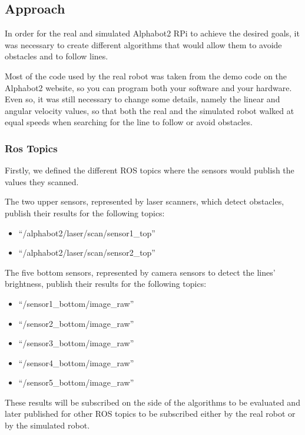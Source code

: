 \documentclass[conference]{IEEEtran}
\begin{document}
\subsection{Approach} \label{alg}

In order for the real and simulated Alphabot2 RPi to achieve the desired goals, it was necessary to create different algorithms that would allow them to avoide obstacles and to follow lines.

Most of the code used by the real robot was taken from the demo code on the Alphabot2 website, so you can program both your software and your hardware. Even so, it was still necessary to change some details, namely the linear and angular velocity values, so that both the real and the simulated robot walked at equal speeds when searching for the line to follow or avoid obstacles.

\subsubsection{Ros Topics} \label{topics}

Firstly, we defined the different ROS topics where the sensors would publish the values they scanned.

The two upper sensors, represented by laser scanners, which detect obstacles, publish their results for the following topics:

\begin{itemize}
    \item ``/alphabot2/laser/scan/sensor1\_top''
    \item ``/alphabot2/laser/scan/sensor2\_top''
\end{itemize}

The five bottom sensors, represented by camera sensors to detect the lines' brightness, publish their results for the following topics:

\begin{itemize}
    \item ``/sensor1\_bottom/image\_raw''
    \item ``/sensor2\_bottom/image\_raw''
    \item ``/sensor3\_bottom/image\_raw''
    \item ``/sensor4\_bottom/image\_raw''
    \item ``/sensor5\_bottom/image\_raw''
\end{itemize}

These results will be subscribed on the side of the algorithms to be evaluated and later published for other ROS topics to be subscribed either by the real robot or by the simulated robot.
\end{document}
